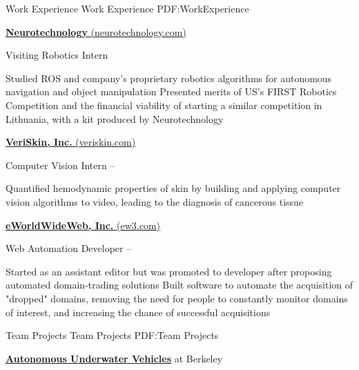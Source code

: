 \documentclass[letterpaper,MMMyyyy,nonstopmode]{simpleresumecv}
\begin{document}
\begin{Body}

\Section
{Work Experience}
{Work Experience}
{PDF:WorkExperience}

\Entry
\href{http://www.neurotechnology.com/}
{\textbf{Neurotechnology} (neurotechnology.com)}

\Gap
\BulletItem
Visiting Robotics Intern
\hfill
{}
\begin{Detail}
\SubBulletItem
Studied ROS and company’s proprietary robotics algorithms for autonomous navigation and object manipulation
\SubBulletItem
Presented merits of US's FIRST Robotics Competition and the financial viability of starting a similar competition in Lithuania, with a kit produced by Neurotechnology
\end{Detail}

\BigGap
\BigGap
\Entry
\href{http://www.veriskin.com/}
{\textbf{VeriSkin, Inc.} (veriskin.com)}

\Gap
\BulletItem
Computer Vision Intern
\hfill
{} --
\begin{Detail}
\SubBulletItem
Quantified hemodynamic properties of skin by building and applying computer vision algorithms to video, leading to the diagnosis of cancerous tissue
\end{Detail}

\BigGap
\BigGap
\Entry
\href{http://ew3.com/}
{\textbf{eWorldWideWeb, Inc.} (ew3.com)}

\Gap
\BulletItem
Web Automation Developer
\hfill
{} --
\begin{Detail}
\SubBulletItem
Started as an assistant editor but was promoted to developer after proposing automated domain-trading solutions
\SubBulletItem
Built software to automate the acquisition of "dropped" domains, removing the need for people to constantly monitor domains of interest, and increasing the chance of successful acquisitions
\end{Detail}




\Section
{Team Projects}
{Team Projects}
{PDF:Team Projects}

\Entry
\href{https://callink.berkeley.edu/organization/auvs_at_berkeley}
{\textbf{Autonomous Underwater Vehicles}} at
Berkeley


\end{Body}
\end{document}
